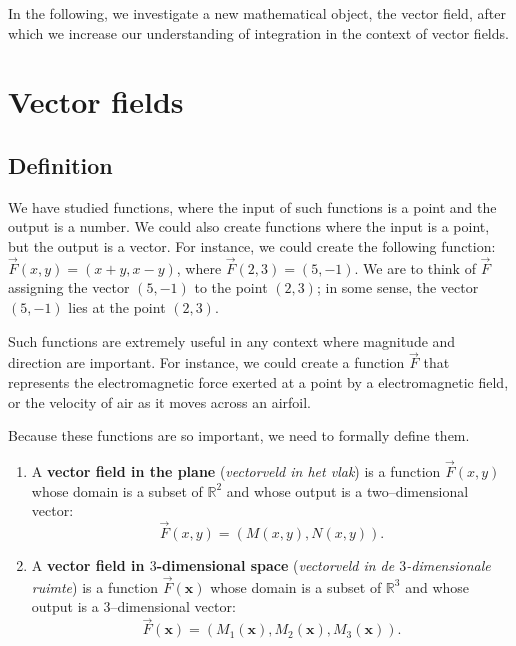 In the following, we investigate a new mathematical object, the vector field, after which we increase our understanding of integration in the context of vector fields.


\section{Vector fields}\label{sec:vector_fields}
\subsection{Definition}
	\checkoddpage
{}
We have studied functions, where the input of such functions is a point and the output is a number. We could also create functions where the input is a point, but the output is a  vector. For instance, we could create the following function: $\vec F(x,y) = \left( x+y, x-y\right)$, where $\vec F(2,3) = \left( 5,-1\right)$. We are to think of $\vec F$ assigning the vector $\left( 5,-1\right)$ to the point $(2,3)$; in some sense, the vector $\left( 5,-1\right)$ lies at the point $(2,3)$. 

Such functions are extremely useful in any context where magnitude and direction are important. For instance, we could create a function $\vec F$ that represents the electromagnetic force exerted at a point by a electromagnetic field, or the velocity of air as it moves across an airfoil. 

Because these functions are so important, we need to formally define them.

\begin{definition}\label{def:vector_field}
\begin{enumerate}
	\item A \textbf{vector field in the plane} (\textit{vectorveld in het vlak}) is a function $\vec F(x,y)$ whose domain is a subset of $\mathbb{R}^2$ and whose output is a two--dimensional vector:
	$$\vec F(x,y) = \left( M(x,y), N(x,y)\right).$$
	
	\item A \textbf{vector field in $3$-dimensional space} (\textit{vectorveld in de $3$-dimensionale ruimte}) is a function $\vec F(\mathbf{x})$ whose domain is a subset of $\mathbb{R}^3$ and whose output is a $3$--dimensional vector:
	$$\vec F(\mathbf{x}) = \left( M_1(\mathbf{x}), M_2(\mathbf{x}), M_3(\mathbf{x})\right).$$
\end{enumerate}
\end{definition}

